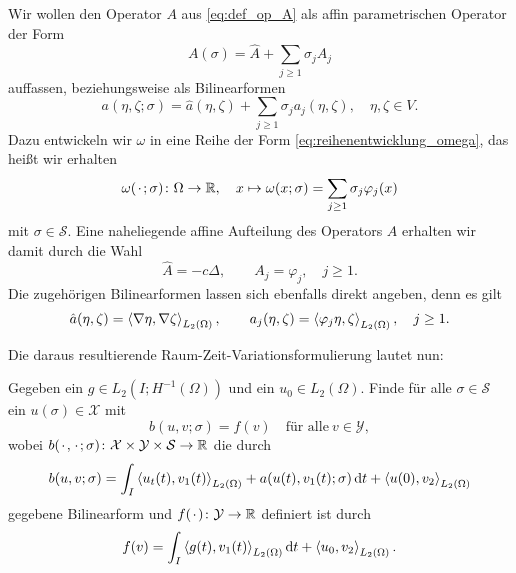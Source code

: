 Wir wollen den Operator $A$ aus \eqref{eq:def_op_A} als affin parametrischen Operator der Form
\begin{equation}
    \label{eq:aff_zerlegung_A}
    A(\sigma) = \hat A + \sum_{j \geq 1} \sigma_{j} A_{j}
\end{equation}
auffassen, beziehungsweise als Bilinearformen
\begin{equation}
     \label{eq:aff_zerelgung_A_bf}
     a(\eta, \zeta; \sigma) = \hat a(\eta, \zeta) + \sum_{j \geq 1} \sigma_{j} a_{j}(\eta, \zeta), \quad \eta, \zeta \in V.
 \end{equation}
Dazu entwickeln wir $\omega$ in eine Reihe der Form \eqref{eq:reihenentwicklung_omega}, das heißt wir erhalten
\begin{equation}
    \label{eq:omega_reihenentwicklung}
    \omega({\mkern2mu\cdot\mkern2mu}; \sigma) \colon \Omega \to \mathbb{R}, \quad x \mapsto \omega(x; \sigma) = \sum_{j \geq 1} \sigma_{j} \varphi_{j}(x)
\end{equation}
mit $\sigma \in \mathcal S$.
Eine naheliegende affine Aufteilung des Operators $A$ erhalten wir damit durch die Wahl
\begin{equation}
    \label{eq:affine_zerlegung_A_def}
    \hat A = - c \Delta, \qquad
    A_{j} = \varphi_{j}, \quad j \geq 1.
\end{equation}
Die zugehörigen Bilinearformen lassen sich ebenfalls direkt angeben, denn es gilt
\begin{equation}
    \hat a(\eta, \zeta) = \left\langle\nabla \eta,\nabla \zeta\right\rangle_{L_{2}(\Omega)}, \qquad a_{j}(\eta, \zeta) = \left\langle\varphi_{j} \eta,\zeta\right\rangle_{L_{2}(\Omega)}, \quad j \geq 1.
\end{equation}

Die daraus resultierende Raum-Zeit-Variationsformulierung lautet nun:
\begin{Problem}
    Gegeben ein $g \in L_{2}(I; H^{-1}(\Omega))$ und ein $u_{0} \in L_{2}(\Omega)$.
    Finde für alle $\sigma \in \mathcal S$ ein $u(\sigma) \in \mathcal X$ mit
    \begin{equation}
        \label{eq:varprob_2}
        b(u, v; \sigma) = f(v) \quad \text{für alle}~v \in \mathcal Y,
    \end{equation}
    wobei $b({\mkern2mu\cdot\mkern2mu}, {\mkern2mu\cdot\mkern2mu}; \sigma) \colon \mathcal X \times \mathcal Y \times \mathcal S \to \mathbb{R}$ die durch
    \begin{equation}
        \label{eq:buv_2}
        b(u, v; \sigma)
            = \int_{I} \left\langle u_{t}(t),v_{1}(t)\right\rangle_{L_{2}(\Omega)} + a(u(t), v_{1}(t); \sigma) \mathop{}\!\mathrm{d} t + \left\langle u(0),v_{2}\right\rangle_{L_{2}(\Omega)}
    \end{equation}
    gegebene Bilinearform und $f({\mkern2mu\cdot\mkern2mu}) \colon \mathcal Y \to \mathbb{R}$ definiert ist durch
    \begin{equation}
        \label{eq:var_all_f_wiederholung_2}
        f(v) = \int_{I} \left\langle g(t),v_{1}(t)\right\rangle_{L_{2}(\Omega)} \mathop{}\!\mathrm{d} t + \left\langle u_{0},v_{2}\right\rangle_{L_{2}(\Omega)}.
    \end{equation}
\end{Problem}



